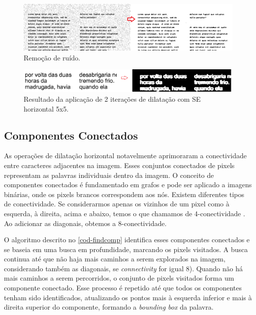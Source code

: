 \documentclass[english, 
               brazil, 
               bsc] %
               {dcomp-abntex2}
\begin{document}
\begin{figure}[htb]
        \caption{\label{ruidos} \small  Remoção de ruído. }
        \begin{center}
            \includegraphics[scale=0.55]{./images/noise.png}
        \end{center}
\end{figure}


\begin{figure}[htb]
        \caption{\label{horz} \small Resultado da aplicação de 2 iterações de dilatação com SE horizontal 5x5. }
        \begin{center}
            \includegraphics[scale=0.15]{./images/horizontal_5x5_aplicacao.png}
        \end{center}
\end{figure}



\subsection{Componentes Conectados}


As operações de dilatação horizontal notavelmente aprimoraram a conectividade entre caracteres adjacentes na imagem. Esses conjuntos conectados de pixels representam as palavras individuais dentro da imagem. O conceito de componentes conectados é fundamentado em grafos e pode ser aplicado a imagens binárias, onde os pixels brancos correspondem aos nós. Existem diferentes tipos de conectividade. Se considerarmos apenas os vizinhos de um pixel como à esquerda, à direita, acima e abaixo, temos o que chamamos de 4-conectividade \cite[2.5.2 Adjacency, Connectivity, Regions, and Boundaries]{gonzalez2008digital}. Ao adicionar as diagonais, obtemos a 8-conectividade.

O algoritmo descrito no \autoref{cod-findcomp} identifica esses componentes conectados e se baseia em uma busca em profundidade, marcando os pixels visitados. A busca continua até que não haja mais caminhos a serem explorados na imagem, considerando também as diagonais, se \textit{connectivity} for igual 8). Quando não há mais caminhos a serem percorridos, o conjunto de pixels visitados forma um componente conectado. Esse processo é repetido até que todos os componentes tenham sido identificados, atualizando os pontos mais à esquerda inferior e mais à direita superior do componente, formando a \textit{bounding box} da palavra.
\end{document}
